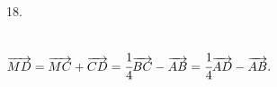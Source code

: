 18. \begin{figure}[ht!]
\end{figure}\\
$\overrightarrow{MD}=\overrightarrow{MC}+\overrightarrow{CD}=\cfrac{1}{4}\overrightarrow{BC}-\overrightarrow{AB}=
\cfrac{1}{4}\overrightarrow{AD}-\overrightarrow{AB}.$\\
